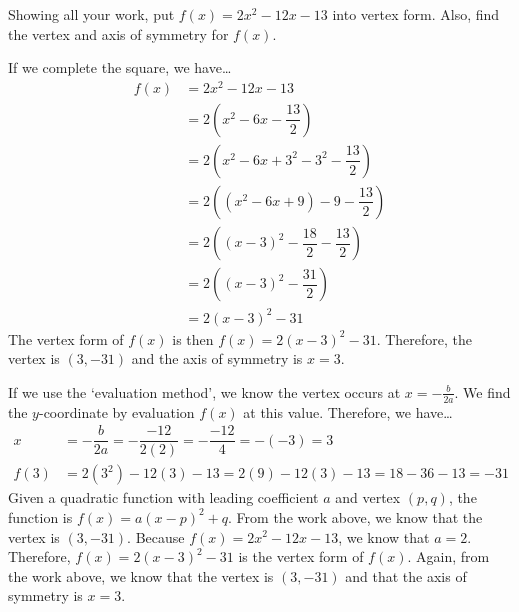 \documentclass[11pt,letterpaper]{article}
\begin{document}
\newpage



 Showing all your work, put $f(x)= 2x^2 - 12x - 13$ into vertex form. Also, find the vertex and axis of symmetry for $f(x)$. \pspace

\sol If we complete the square, we have\dots
	\[
	\begin{aligned}
	f(x)&= 2x^2 - 12x - 13 \\
	&= 2 \left( x^2 - 6x - \dfrac{13}{2} \right) \\
	&= 2 \left( x^2 - 6x + 3^2 - 3^2 - \dfrac{13}{2} \right) \\
	&= 2 \left( (x^2 - 6x + 9) - 9 - \dfrac{13}{2} \right) \\
	&= 2 \left( (x - 3)^2 - \dfrac{18}{2} - \dfrac{13}{2} \right) \\
	&= 2 \left( (x - 3)^2 - \dfrac{31}{2} \right) \\
	&= 2(x - 3)^2 - 31
	\end{aligned}
	\]
The vertex form of $f(x)$ is then $f(x)= 2(x - 3)^2 - 31$. Therefore, the vertex is $(3, -31)$ and the axis of symmetry is $x= 3$. \pspace

If we use the `evaluation method', we know the vertex occurs at $x= - \frac{b}{2a}$. We find the $y$-coordinate by evaluation $f(x)$ at this value. Therefore, we have\dots
	\[
	\begin{aligned}
	x&= -\dfrac{b}{2a}= -\dfrac{-12}{2(2)}= -\dfrac{-12}{4}= -(-3)= 3 \\
	f(3)&= 2(3^2) - 12(3) - 13= 2(9) - 12(3) - 13= 18 - 36 - 13= -31
	\end{aligned}
	\]
Given a quadratic function with leading coefficient $a$ and vertex $(p, q)$, the function is $f(x)= a(x - p)^2 + q$. From the work above, we know that the vertex is $(3, -31)$. Because $f(x)= 2x^2 - 12x - 13$, we know that $a= 2$. Therefore, $f(x)= 2(x - 3)^2 - 31$ is the vertex form of $f(x)$. Again, from the work above, we know that the vertex is $(3, -31)$ and that the axis of symmetry is $x= 3$. 
\end{document}
